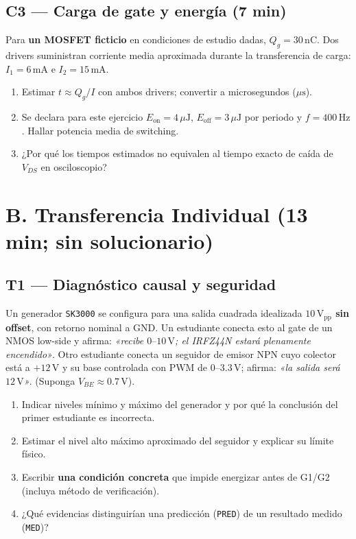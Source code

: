 \documentclass[11pt, a4paper]{article}
\begin{document}
\subsection*{C3 — Carga de gate y energía (7 min)}
Para \textbf{un MOSFET ficticio} en condiciones de estudio dadas, $Q_g = 30\,\text{nC}$. Dos drivers suministran corriente media aproximada durante la transferencia de carga: $I_1 = 6\,\text{mA}$ e $I_2 = 15\,\text{mA}$.
\begin{enumerate}[label=\arabic*., noitemsep]
    \item Estimar $t \approx Q_g/I$ con ambos drivers; convertir a microsegundos ($\mu\text{s}$).
    \item Se declara para este ejercicio $E_{\text{on}}=4\,\mu\text{J}$, $E_{\text{off}}=3\,\mu\text{J}$ por periodo y $f=400\,\text{Hz}$. Hallar potencia media de switching.
    \item ¿Por qué los tiempos estimados no equivalen al tiempo exacto de caída de $V_{DS}$ en osciloscopio?
\end{enumerate}

\section*{B. Transferencia Individual (13 min; sin solucionario)}
\subsection*{T1 — Diagnóstico causal y seguridad}
Un generador \texttt{SK3000} se configura para una salida cuadrada idealizada \textbf{$10\,\text{V}_{\text{pp}}$ sin offset}, con retorno nominal a GND. Un estudiante conecta esto al gate de un NMOS low-side y afirma: \textit{«recibe $0\text{--}10\,\text{V}$; el IRFZ44N estará plenamente encendido»}. 
Otro estudiante conecta un seguidor de emisor NPN cuyo colector está a $+12\,\text{V}$ y su base controlada con PWM de $0\text{--}3.3\,\text{V}$; afirma: \textit{«la salida será $12\,\text{V}$»}. (Suponga $V_{BE} \approx 0.7\,\text{V}$).
\begin{enumerate}[label=\arabic*., noitemsep]
    \item Indicar niveles mínimo y máximo del generador y por qué la conclusión del primer estudiante es incorrecta.
    \item Estimar el nivel alto máximo aproximado del seguidor y explicar su límite físico.
    \item Escribir \textbf{una condición concreta} que impide energizar antes de G1/G2 (incluya método de verificación).
    \item ¿Qué evidencias distinguirían una predicción (\texttt{PRED}) de un resultado medido (\texttt{MED})?
\end{enumerate}
\end{document}
